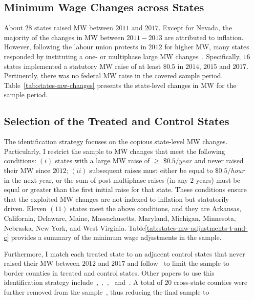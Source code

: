 \documentclass[12pt, english]{article}
\begin{document}
    \subsection{Minimum Wage Changes across States}\label{subsec:minimum-wage-changes-across-states}
    About $28$ states raised MW between $2011$ and $2017$. Except for Nevada, the majority of the changes in MW between $2011-2013$ are attributed to inflation. However, following the labour union protests in $2012$ for higher MW, many states responded by instituting a one- or multiphase large MW changes~\parencite{lathrop2021raises}. Specifically, $16$ states implemented a statutory MW raise of at least $\$0.5$ in $2014$, $2015$ and $2017$. Pertinently, there was no federal MW raise in the covered sample period. Table~\ref{tab:states-mw-changes} presents the state-level changes in MW for the sample period.

    \subsection{Selection of the Treated and Control States}\label{subsec:selection-of-the-treated-and-control-states}
    The identification strategy focuses on the copious state-level MW changes. Particularly, I restrict the sample to MW changes that meet the following conditions: $(i)$ states with a large MW raise of $\geq$ $\$0.5/year$ and never raised their MW since $2012$; $(ii)$ subsequent raises must either be equal to $\$0.5/hour$ in the next year, or the sum of post-multiphase raises (in any $2$-years) must be equal or greater than the first initial raise for that state. These conditions ensure that the exploited MW changes are not indexed to inflation but statutorily driven. Eleven $(11)$ states meet the above conditions, and they are Arkansas, California, Delaware, Maine, Massachusetts, Maryland, Michigan, Minnesota, Nebraska, New York, and West Virginia. Table\ref{tab:states-mw-adjustments-t-and-c} provides a summary of the minimum wage adjustments in the sample.

    Furthermore, I match each treated state to an adjacent control states that never raised their MW between $2012$ and $2017$ and follow~\cite{dube2010minimum} to limit the sample to border counties in treated and control states. Other papers to use this identification strategy include~\cite{aaronson2018industry},~\cite{dube2019fairness},~\cite{jardim2018minimum},~\cite{zhang2019distributional} and~\cite{gopalan2021state}. A total of $20$ cross-state counties were further removed from the sample~\parencite{zhang2023unintended}, thus reducing the final sample to
    
\end{document}
